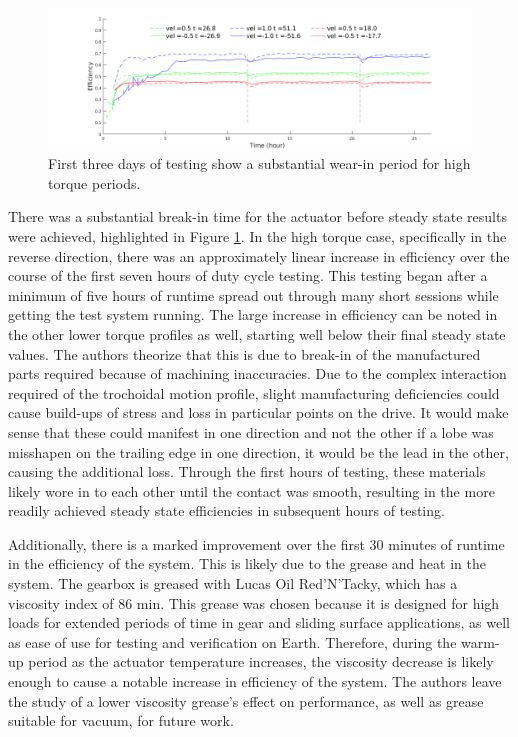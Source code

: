 \begin{figure}[t]
   \centering
   \includegraphics[width=\linewidth]{fig/burn_in}
   \caption{First three days of testing show a substantial wear-in period for high torque periods.}
   \label{fig:break_in}
\end{figure}

There was a substantial break-in time for the actuator before steady state results were achieved, highlighted in Figure \ref{fig:break_in}.
In the high torque case, specifically in the reverse direction, there was an approximately linear increase in efficiency over the course of the first seven hours of duty cycle testing.
This testing began after a minimum of five hours of runtime spread out through many short sessions while getting the test system running.
The large increase in efficiency can be noted in the other lower torque profiles as well, starting well below their final steady state values.
The authors theorize that this is due to break-in of the manufactured parts required because of machining inaccuracies.
Due to the complex interaction required of the trochoidal motion profile, slight manufacturing deficiencies could cause build-ups of stress and loss in particular points on the drive.
It would make sense that these could manifest in one direction and not the other if a lobe was misshapen on the trailing edge in one direction, it would be the lead in the other, causing the additional loss.
Through the first hours of testing, these materials likely wore in to each other until the contact was smooth, resulting in the more readily achieved steady state efficiencies in subsequent hours of testing.

Additionally, there is a marked improvement over the first 30 minutes of runtime in the efficiency of the system.
This is likely due to the grease and heat in the system.
The gearbox is greased with Lucas Oil Red'N'Tacky, which has a viscosity index of 86 min.
This grease was chosen because it is designed for high loads for extended periods of time in gear and sliding surface applications, as well as ease of use for testing and verification on Earth.
Therefore, during the warm-up period as the actuator temperature increases, the viscosity decrease is likely enough to cause a notable increase in efficiency of the system.
The authors leave the study of a lower viscosity grease's effect on performance, as well as grease suitable for vacuum, for future work.

